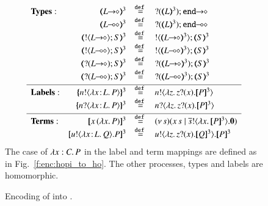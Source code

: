 \begin{figure}[t]
\[
\begin{array}{lrcll}
\noindent{\bf Types:} & 
		\tmap{\shot{L}}{3} &\defeq& \shot{\btinp{\tmap{L}{3}} \tinact}
		\\
&		\tmap{\lhot{L}}{3} &\defeq& \lhot{\btinp{\tmap{L}{3}} \tinact}
		\\
&		\tmap{\btout{\shot{L}} S}{3} &\defeq& \btout{\tmap{\shot{L}}{3}} \tmap{S}{3}
		\\
&		\tmap{\btout{\lhot{L}} S}{3} &\defeq& \btout{\tmap{\lhot{L}}{3}} \tmap{S}{3}
		\\
&		\tmap{\btinp{\shot{L}} S}{3} &\defeq& \btinp{\tmap{\shot{L}}{3}} \tmap{S}{3}
		\\
&		\tmap{\btinp{\lhot{L}} S}{3} &\defeq& \btinp{\tmap{\lhot{L}}{3}} \tmap{S}{3}
\\[1mm]
\hline
\noindent{\bf Labels:} & 
		\mapa{\bactout{n}{\abs{\AT{x}{L}}{P}}}^{3} &\defeq& \bactout{n}{\abs{z}{\binp{z}{x} \pmap{P}{3}}}
		\\
&		\mapa{\bactinp{n}{\abs{\AT{x}{L}}{P}}}^{3} &\defeq& \bactinp{n}{\abs{z}{\binp{z}{x} \pmap{P}{3}}}
\\[1mm]
\hline
{\bf Terms}: & 
	\pmap{\appl{x}{(\abs{x} P)}}{3} &\defeq& \newsp{s}{\appl{x}{s} \Par \bout{\dual{s}}{\abs{x} \pmap{P}{3}} \inact}
		\\
&	\pmap{\bout{u}{\abs{\AT{x}{L}}{Q}} P}{3} &\defeq& \bout{u}{\abs{z}{\binp{z}{x} \pmap{Q}{3}}} \pmap{P}{3}
	\end{array}
	\]
The case of $\lambda x:C.\,P$ in the label and term mappings 
are defined as in Fig.~\ref{f:enc:hopi_to_ho}.  
The other processes, types and labels are  homomorphic. 
\caption{\label{f:enc:hopip_to_hopi} 
Encoding of \HOpp into \HOp.
}
\Hline
\end{figure} 







